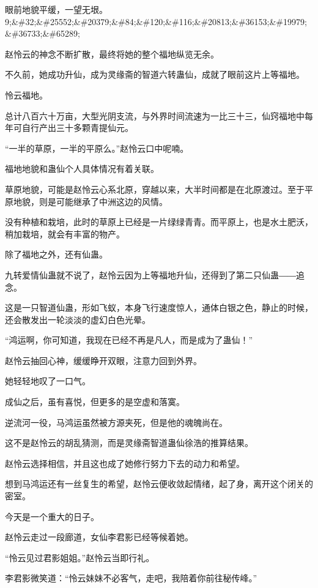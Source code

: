 
\begin{this_body}

眼前地貌平缓，一望无垠。9;\&\#32;\&\#25552;\&\#20379;\&\#84;\&\#120;\&\#116;\&\#20813;\&\#36153;\&\#19979;\&\#36733;\&\#65289;

赵怜云的神念不断扩散，最终将她的整个福地纵览无余。

不久前，她成功升仙，成为灵缘斋的智道六转蛊仙，成就了眼前这片上等福地。

怜云福地。

总计八百六十万亩，大型光阴支流，与外界时间流速为一比三十三，仙窍福地中每年可自行产出三十多颗青提仙元。

“一半的草原，一半的平原么。”赵怜云口中呢喃。

福地地貌和蛊仙个人具体情况有着关联。

草原地貌，可能是赵怜云心系北原，穿越以来，大半时间都是在北原渡过。至于平原地貌，则是可能继承了中洲这边的风情。

没有种植和栽培，此时的草原上已经是一片绿绿青青。而平原上，也是水土肥沃，稍加栽培，就会有丰富的物产。

除了福地之外，还有仙蛊。

九转爱情仙蛊就不说了，赵怜云因为上等福地升仙，还得到了第二只仙蛊――追念。

这是一只智道仙蛊，形如飞蚁，本身飞行速度惊人，通体白银之色，静止的时候，还会散发出一轮淡淡的虚幻白色光晕。

“鸿运啊，你可知道，我现在已经不再是凡人，而是成为了蛊仙！”

赵怜云抽回心神，缓缓睁开双眼，注意力回到外界。

她轻轻地叹了一口气。

成仙之后，虽有喜悦，但更多的是空虚和落寞。

逆流河一役，马鸿运虽然被方源夹死，但是他的魂魄尚在。

这不是赵怜云的胡乱猜测，而是灵缘斋智道蛊仙徐浩的推算结果。

赵怜云选择相信，并且这也成了她修行努力下去的动力和希望。

想到马鸿运还有一丝复生的希望，赵怜云便收敛起情绪，起了身，离开这个闭关的密室。

今天是一个重大的日子。

赵怜云走过一段廊道，女仙李君影已经等候着她。

“怜云见过君影姐姐。”赵怜云当即行礼。

李君影微笑道：“怜云妹妹不必客气，走吧，我陪着你前往秘传峰。”


\end{this_body}
